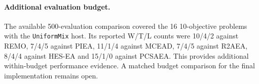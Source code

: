 \paragraph{Additional evaluation budget.}
The available 500-evaluation comparison covered the 16 10-objective
problems with the \texttt{UniformMix} host. Its reported W/T/L counts
were 10/4/2 against REMO, 7/4/5 against PIEA, 11/1/4 against MCEAD,
7/4/5 against R2AEA, 8/4/4 against HES-EA and 15/1/0 against PCSAEA.
This provides additional within-budget performance evidence. A
matched budget comparison for the final implementation remains open.


\clearpage
